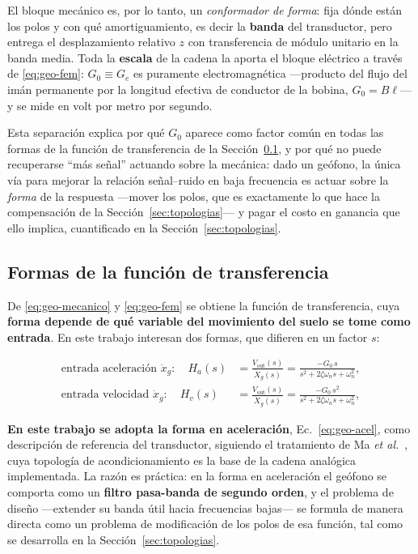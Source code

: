El bloque mec\'anico es, por lo tanto, un \emph{conformador de forma}: fija d\'onde est\'an
los polos y con qu\'e amortiguamiento, es decir la \textbf{banda} del transductor, pero
entrega el desplazamiento relativo $z$ con transferencia de m\'odulo unitario en la banda
media. Toda la \textbf{escala} de la cadena la aporta el bloque el\'ectrico a trav\'es de
\eqref{eq:geo-fem}: $G_0\equiv G_e$ es puramente electromagn\'etica ---producto del flujo
del im\'an permanente por la longitud efectiva de conductor de la bobina, $G_0=B\ell$---
y se mide en volt por metro por segundo.

Esta separaci\'on explica por qu\'e $G_0$ aparece como factor com\'un en todas las formas de
la funci\'on de transferencia de la Secci\'on~\ref{sec:geo-tres-formas}, y por qu\'e no
puede recuperarse ``m\'as se\~nal'' actuando sobre la mec\'anica: dado un ge\'ofono, la
\'unica v\'ia para mejorar la relaci\'on se\~nal--ruido en baja frecuencia es actuar sobre
la \emph{forma} de la respuesta ---mover los polos, que es exactamente lo que hace la
compensaci\'on de la Secci\'on~\ref{sec:topologias}--- y pagar el costo en ganancia que
ello implica, cuantificado en la Secci\'on~\ref{sec:topologias}.

\subsection{Formas de la funci\'on de transferencia}
\label{sec:geo-tres-formas}

De \eqref{eq:geo-mecanico} y \eqref{eq:geo-fem} se obtiene la funci\'on de transferencia,
cuya \textbf{forma depende de qu\'e variable del movimiento del suelo se tome como
entrada}. En este trabajo interesan dos formas, que difieren en un factor $s$:

\begin{align}
\text{entrada aceleraci\'on } \ddot{x}_g:\quad
H_a(s)&=\frac{V_{\mathrm{out}}(s)}{\ddot{X}_g(s)}
=\frac{-G_0\,s}{s^{2}+2\zeta\omega_n s+\omega_n^{2}},
\label{eq:geo-acel}\\[0.4em]
\text{entrada velocidad } \dot{x}_g:\quad
H_v(s)&=\frac{V_{\mathrm{out}}(s)}{\dot{X}_g(s)}
=\frac{-G_0\,s^{2}}{s^{2}+2\zeta\omega_n s+\omega_n^{2}},
\label{eq:geo-vel}
\end{align}

\textbf{En este trabajo se adopta la forma en aceleraci\'on}, Ec.~\eqref{eq:geo-acel},
como descripci\'on de referencia del transductor, siguiendo el tratamiento de Ma
\emph{et al.}~\cite{Ma2023}, cuya topolog\'ia de acondicionamiento es la base de la cadena
anal\'ogica implementada. La raz\'on es pr\'actica: en la forma en aceleraci\'on el ge\'ofono se
comporta como un \textbf{filtro pasa-banda de segundo orden}, y el problema de dise\~no
---extender su banda \'util hacia frecuencias bajas--- se formula de manera directa como
un problema de modificaci\'on de los polos de esa funci\'on, tal como se desarrolla en la
Secci\'on~\ref{sec:topologias}.

